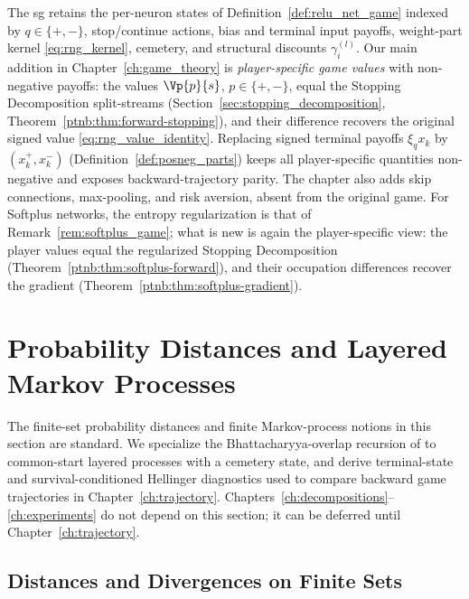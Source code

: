 \begin{remark}\label{rem:inherited_vs_new}
The \ac{sg} retains the per-neuron states of Definition~\ref{def:relu_net_game} indexed by $q\in\{+,-\}$, stop/continue actions, bias and terminal input payoffs, weight-part kernel \eqref{eq:rng_kernel}, cemetery, and structural discounts $\gamma^{(l)}_i$. Our main addition in Chapter~\ref{ch:game_theory} is \emph{player-specific game values} with non-negative payoffs: the values $\Vp{p}{s}$, $p\in\{+,-\}$, equal the Stopping Decomposition split-streams (Section~\ref{sec:stopping_decomposition}, Theorem~\ref{ptnb:thm:forward-stopping}), and their difference recovers the original signed value \eqref{eq:rng_value_identity}. Replacing signed terminal payoffs $\xi_qx_k$ by $(x_k^+,x_k^-)$ (Definition~\ref{def:posneg_parts}) keeps all player-specific quantities non-negative and exposes backward-trajectory parity. The chapter also adds skip connections, max-pooling, and risk aversion, absent from the original game. For Softplus networks, the entropy regularization is that of Remark~\ref{rem:softplus_game}; what is new is again the player-specific view: the player values equal the regularized Stopping Decomposition (Theorem~\ref{ptnb:thm:softplus-forward}), and their occupation differences recover the gradient (Theorem~\ref{ptnb:thm:softplus-gradient}).
\end{remark}

\section{Probability Distances and Layered Markov Processes}\label{sec:probabilistic_foundations}\label{ptnb:app:path-divergence}

The finite-set probability distances and finite Markov-process notions in this section are standard. We specialize the Bhattacharyya-overlap recursion of \textcite{Kazakos1978} to common-start layered processes with a cemetery state, and derive terminal-state and survival-conditioned Hellinger diagnostics used to compare backward game trajectories in Chapter~\ref{ch:trajectory}. Chapters~\ref{ch:decompositions}--\ref{ch:experiments} do not depend on this section; it can be deferred until Chapter~\ref{ch:trajectory}.

\subsection{Distances and Divergences on Finite Sets}\label{sec:probability_distances}

